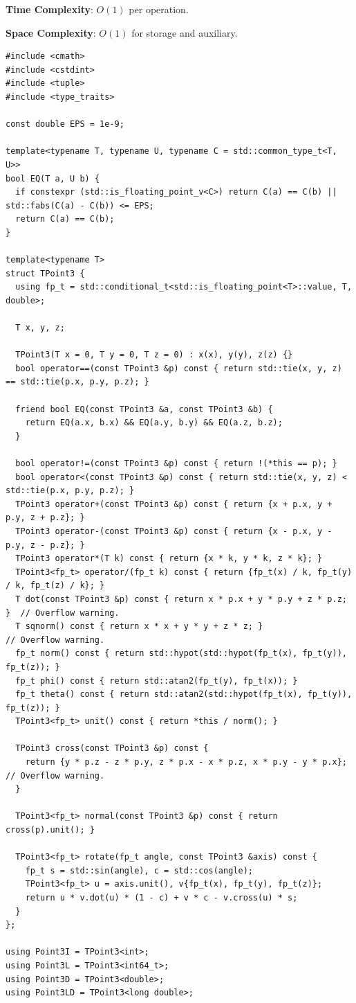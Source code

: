 \textbf{Time Complexity}: $O(1)$ per operation.

\textbf{Space Complexity}: $O(1)$ for storage and auxiliary.

\begin{lstlisting}[style=cpp]
#include <cmath>
#include <cstdint>
#include <tuple>
#include <type_traits>

const double EPS = 1e-9;

template<typename T, typename U, typename C = std::common_type_t<T, U>>
bool EQ(T a, U b) {
  if constexpr (std::is_floating_point_v<C>) return C(a) == C(b) || std::fabs(C(a) - C(b)) <= EPS;
  return C(a) == C(b);
}

template<typename T>
struct TPoint3 {
  using fp_t = std::conditional_t<std::is_floating_point<T>::value, T, double>;

  T x, y, z;

  TPoint3(T x = 0, T y = 0, T z = 0) : x(x), y(y), z(z) {}
  bool operator==(const TPoint3 &p) const { return std::tie(x, y, z) == std::tie(p.x, p.y, p.z); }

  friend bool EQ(const TPoint3 &a, const TPoint3 &b) {
    return EQ(a.x, b.x) && EQ(a.y, b.y) && EQ(a.z, b.z);
  }

  bool operator!=(const TPoint3 &p) const { return !(*this == p); }
  bool operator<(const TPoint3 &p) const { return std::tie(x, y, z) < std::tie(p.x, p.y, p.z); }
  TPoint3 operator+(const TPoint3 &p) const { return {x + p.x, y + p.y, z + p.z}; }
  TPoint3 operator-(const TPoint3 &p) const { return {x - p.x, y - p.y, z - p.z}; }
  TPoint3 operator*(T k) const { return {x * k, y * k, z * k}; }
  TPoint3<fp_t> operator/(fp_t k) const { return {fp_t(x) / k, fp_t(y) / k, fp_t(z) / k}; }
  T dot(const TPoint3 &p) const { return x * p.x + y * p.y + z * p.z; }  // Overflow warning.
  T sqnorm() const { return x * x + y * y + z * z; }                     // Overflow warning.
  fp_t norm() const { return std::hypot(std::hypot(fp_t(x), fp_t(y)), fp_t(z)); }
  fp_t phi() const { return std::atan2(fp_t(y), fp_t(x)); }
  fp_t theta() const { return std::atan2(std::hypot(fp_t(x), fp_t(y)), fp_t(z)); }
  TPoint3<fp_t> unit() const { return *this / norm(); }

  TPoint3 cross(const TPoint3 &p) const {
    return {y * p.z - z * p.y, z * p.x - x * p.z, x * p.y - y * p.x};  // Overflow warning.
  }

  TPoint3<fp_t> normal(const TPoint3 &p) const { return cross(p).unit(); }

  TPoint3<fp_t> rotate(fp_t angle, const TPoint3 &axis) const {
    fp_t s = std::sin(angle), c = std::cos(angle);
    TPoint3<fp_t> u = axis.unit(), v{fp_t(x), fp_t(y), fp_t(z)};
    return u * v.dot(u) * (1 - c) + v * c - v.cross(u) * s;
  }
};

using Point3I = TPoint3<int>;
using Point3L = TPoint3<int64_t>;
using Point3D = TPoint3<double>;
using Point3LD = TPoint3<long double>;
\end{lstlisting}

